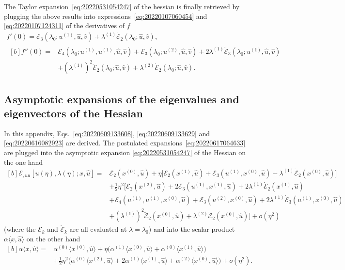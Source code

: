 \documentclass[12pt, final]{scrartcl}
\theoremstyle{definition}
\newcommand{\E}{\mathcal E}
\newcommand{\order}[2][1]{#2^{(#1)}}
\begin{document}
The Taylor expansion~\eqref{eq:20220531054247} of the hessian is finally
retrieved by plugging the above results into
expressions~\eqref{eq:20220107060454} and \eqref{eq:20220107124311} of the
derivatives of $f$
\begin{gather*}
  f'(0) = \E_3(\lambda_0; \order[1]u, \hat{u}, \hat{v}) + \order[1]\lambda \dot{\E}_2(\lambda_0; \hat{u}, \hat{v}),\\
  \begin{aligned}[b]
    f''(0) = {} & \E_4(\lambda_0; \order[1]u, \order[1]u, \hat{u}, \hat{v}) + \E_3(\lambda_0; \order[2]u, \hat{u}, \hat{v}) + 2\order[1]\lambda \dot{\E}_3(\lambda_0; \order[1]u, \hat{u}, \hat{v})\\
                & + ( \order[1]\lambda )^2 \ddot{\E}_2(\lambda_0; \hat{u}, \hat{v}) + \order[2]\lambda \dot{\E}_2(\lambda_0; \hat{u}, \hat{v}).
  \end{aligned}
\end{gather*}

\subsection{Asymptotic expansions of the eigenvalues and eigenvectors of the Hessian}
\label{sec:20220616074108}

In this appendix, Eqs.~\eqref{eq:20220609133608}, \eqref{eq:20220609133629} and
\eqref{eq:20220616082923} are derived. The postulated
expansions~\eqref{eq:20220617064633} are plugged into the asymptotic expansion
\eqref{eq:20220531054247} of the Hessian on the one hand
\begin{equation*}
  \begin{aligned}[b]
    \E_{, uu} [u(η), \lambda(η); x, \hat{u}] ={}
    & \E_2(\order[0]x, \hat{u}) + η \bigl[ \E_2(\order[1]x, \hat{u}) + \E_3(\order[1]u, \order[0]x, \hat{u}) + \order[1]\lambda \dot{\E}_2(\order[0]x, \hat{u})\bigr]\\
    & + \tfrac{1}{2} η^2 \bigl[\E_2(\order[2]x, \hat{u}) + 2\E_3(\order[1]u, \order[1]x, \hat{u}) + 2 \order[1]\lambda \dot{\E}_2(\order[1]x, \hat{u})\\
    & + \E_4(\order[1]u, \order[1]u, \order[0]x, \hat{u}) + \E_3(\order[2]u, \order[0]x, \hat{u}) + 2\order[1]\lambda \dot{\E}_3(\order[1]u, \order[0]x, \hat{u})\\
    & + ( \order[1]\lambda )^2 \ddot{\E}_2(\order[0]x, \hat{u}) + \order[2]\lambda \dot{\E}_2(\order[0]x, \hat{u}) \bigr] + o(η^2)
  \end{aligned}
\end{equation*}
(where the $\E_k$ and $\dot{\E}_k$ are all evaluated at $\lambda=\lambda_0$) and into the
scalar product $α 〈 x, \hat{u} 〉$ on the other hand
\begin{equation*}
  \begin{aligned}[b]
    α 〈 x, \hat{u} 〉 ={}
    & \order[0]α 〈 \order[0]x, \hat{u} 〉 + η \bigl(\order[1]α 〈 \order[0]x, \hat{u} 〉 + \order[0]α 〈 \order[1]x, \hat{u} 〉\bigr)\\
    & + \tfrac{1}{2} η^2 \bigl(\order[0]α 〈 \order[2]x, \hat{u} 〉 + 2 \order[1]α 〈 \order[1]x, \hat{u} 〉 + \order[2]α 〈 \order[0]x, \hat{u} 〉\bigr) + o(η^2).
  \end{aligned}
\end{equation*}
\end{document}
